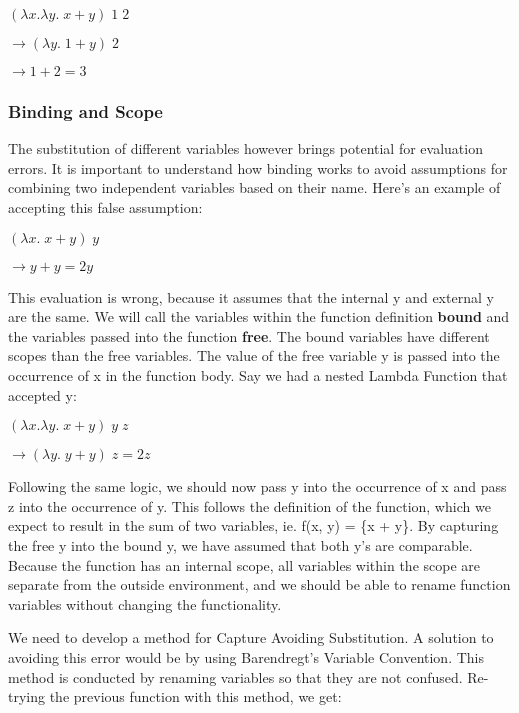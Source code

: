 \documentclass{article}
\begin{document}
    \smallskip
   $(\lambda x.\lambda y. \; x + y) \; 1 \; 2$
   
   
   \smallskip
   $\rightarrow (\lambda y. \; 1 + y) \; 2$
   
   \smallskip
   $\rightarrow 1 + 2 = 3$
    
        \subsubsection{Binding and Scope}
        The substitution of different variables however brings potential for evaluation errors. It is important to understand how binding works to avoid assumptions for combining two independent variables based on their name. Here's an example of accepting this false assumption:
        
        \smallskip
        $(\lambda x. \; x + y) \; y$ 
        
        \smallskip
        $\rightarrow y + y = 2y$
        
        \smallskip\noindent
        This evaluation is wrong, because it assumes that  the internal y and external y are the same. We will call the variables within the function definition \textbf{bound} and the variables passed into the function \textbf{free}. The bound variables have different scopes than the free variables. The value of the free variable y is passed into the occurrence of x in the function body. Say we had a nested Lambda Function that accepted y:
        
        \smallskip
        $(\lambda x. \lambda y. \; x + y) \; y \; z$ 
        
        \smallskip
        $\rightarrow (\lambda y. \; y + y) \; z = 2z$
        
        \smallskip\noindent
        Following the same logic, we should now pass y into the occurrence of x and pass z into the occurrence of y. This follows the definition of the function, which we expect to result in the sum of two variables, ie. f(x, y) = \{x + y\}. By capturing the free y into the bound y, we have assumed that both y's are comparable. Because the function has an internal scope, all variables within the scope are separate from the outside environment, and we should be able to rename function variables without changing the functionality.
        
        \smallskip\noindent
        We need to develop a method for Capture Avoiding Substitution. A solution to avoiding this error would be by using Barendregt’s Variable Convention. This method is conducted by renaming variables so that they are not confused. Re-trying the previous function with this method, we get:
        
\end{document}
